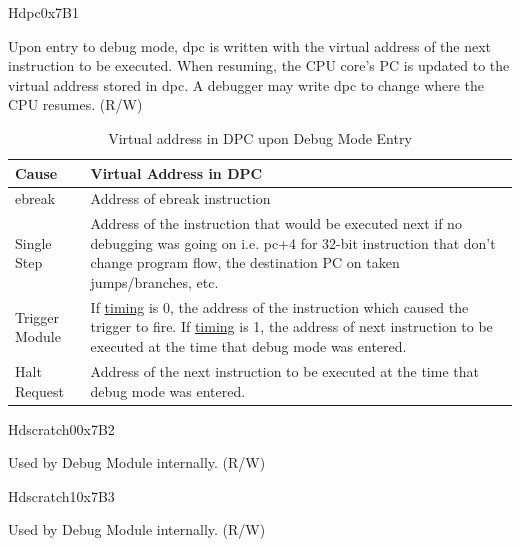 \begin{register}{H}{dpc}{0x7B1}
\label{regdesc:DPC}
%
\regnewline%
\begin{regdesc}
\begin{reglist}
\label{fielddesc:DPC}\item [dpc] Upon entry to debug mode, dpc is written with the virtual address of the next instruction to be executed. When resuming, the CPU core's PC is updated to the virtual address stored in dpc. A debugger may write dpc to change where the CPU resumes. (R/W)
\end{reglist}
\end{regdesc}
\end{register}

\begin{longtable}{| l| p{12cm}|}
\caption{Virtual address in DPC upon Debug Mode Entry} \label{tab:riscvcpu-dbg-cause}
\\ \hline
\rowcolor{lightgray}
\textbf{Cause} & \textbf{Virtual Address in DPC}   \\ \hline
ebreak \label{ebreak} &  Address of ebreak instruction  \\ \hline
Single Step\label{sstep} & Address of the instruction that would be executed next if no debugging was going on i.e. pc+4 for 32-bit instruction that don't change program flow, the destination PC on taken jumps/branches, etc.  \\ \hline
Trigger Module \label{trigger} &  If \hyperref[fielddesc:MCONTROLTIMING]{timing} is 0, the address of the instruction which caused the trigger to fire. If \hyperref[fielddesc:MCONTROLTIMING]{timing} is 1, the address of next instruction to be executed at the time that debug mode was entered.\\ \hline
Halt Request\label{halt} & Address of the next instruction to be executed at the time that debug mode was entered.   \\ \hline
\end{longtable}

\begin{register}{H}{dscratch0}{0x7B2}
\label{regdesc:DSCRATCH0}
%
\regnewline%
\begin{regdesc}
\begin{reglist}
\label{fielddesc:DSCRATCH0}\item [dscratch0] Used by Debug Module internally. (R/W)
\end{reglist}
\end{regdesc}
\end{register}

\begin{register}{H}{dscratch1}{0x7B3}
\label{regdesc:DSCRATCH1}
%
\regnewline%
\begin{regdesc}
\begin{reglist}
\label{fielddesc:DSCRATCH1}\item [dscratch1] Used by Debug Module internally. (R/W)
\end{reglist}
\end{regdesc}
\end{register}